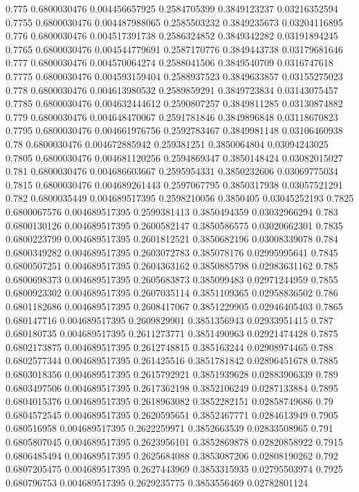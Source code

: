 {0.775 0.6800030476 0.004456657925 0.2584705399 0.3849123237 0.03216352594
0.7755 0.6800030476 0.004487988065 0.2585503232 0.3849235673 0.03204116895
0.776 0.6800030476 0.004517391738 0.2586324852 0.3849342282 0.03191894245
0.7765 0.6800030476 0.004544779691 0.2587170776 0.3849443738 0.03179681646
0.777 0.6800030476 0.004570064274 0.2588041506 0.3849540709 0.0316747618
0.7775 0.6800030476 0.004593159404 0.2588937523 0.3849633857 0.03155275023
0.778 0.6800030476 0.004613980532 0.2589859291 0.3849723834 0.03143075457
0.7785 0.6800030476 0.004632444612 0.2590807257 0.3849811285 0.03130874882
0.779 0.6800030476 0.004648470067 0.2591781846 0.3849896848 0.03118670823
0.7795 0.6800030476 0.004661976756 0.2592783467 0.3849981148 0.03106460938
0.78 0.6800030476 0.004672885942 0.259381251 0.3850064804 0.03094243025
0.7805 0.6800030476 0.004681120256 0.2594869347 0.3850148424 0.03082015027
0.781 0.6800030476 0.004686603667 0.2595954331 0.3850232606 0.03069775034
0.7815 0.6800030476 0.004689261443 0.2597067795 0.3850317938 0.03057521291
0.782 0.6800035449 0.004689517395 0.2598210056 0.3850405 0.03045252193
0.7825 0.6800067576 0.004689517395 0.2599381413 0.3850494359 0.03032966294
0.783 0.6800130126 0.004689517395 0.2600582147 0.3850586575 0.03020662301
0.7835 0.6800223799 0.004689517395 0.2601812521 0.3850682196 0.03008339078
0.784 0.6800349282 0.004689517395 0.2603072783 0.385078176 0.02995995641
0.7845 0.6800507251 0.004689517395 0.2604363162 0.3850885798 0.02983631162
0.785 0.6800698373 0.004689517395 0.2605683873 0.385099483 0.02971244959
0.7855 0.6800923302 0.004689517395 0.2607035114 0.3851109365 0.02958836502
0.786 0.6801182686 0.004689517395 0.2608417067 0.3851229905 0.02946405403
0.7865 0.680147716 0.004689517395 0.2609829901 0.3851356943 0.02933951415
0.787 0.680180735 0.004689517395 0.2611273771 0.3851490963 0.02921474428
0.7875 0.6802173875 0.004689517395 0.2612748815 0.385163244 0.02908974465
0.788 0.6802577344 0.004689517395 0.261425516 0.3851781842 0.02896451678
0.7885 0.6803018356 0.004689517395 0.2615792921 0.3851939628 0.02883906339
0.789 0.6803497506 0.004689517395 0.2617362198 0.3852106249 0.0287133884
0.7895 0.6804015376 0.004689517395 0.2618963082 0.3852282151 0.02858749686
0.79 0.6804572545 0.004689517395 0.2620595651 0.3852467771 0.0284613949
0.7905 0.680516958 0.004689517395 0.2622259971 0.3852663539 0.02833508965
0.791 0.6805807045 0.004689517395 0.2623956101 0.3852869878 0.02820858922
0.7915 0.6806485494 0.004689517395 0.2625684088 0.3853087206 0.02808190262
0.792 0.6807205475 0.004689517395 0.2627443969 0.3853315935 0.02795503974
0.7925 0.680796753 0.004689517395 0.2629235775 0.3853556469 0.02782801124
}
